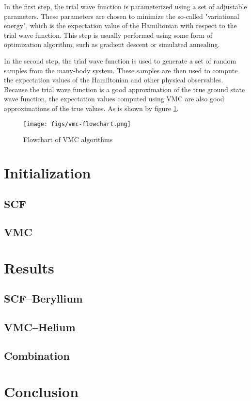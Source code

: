 \documentclass[11pt]{article}
\begin{document}
In the first step, the trial wave function is parameterized using a set of adjustable parameters. These parameters are chosen to minimize the so-called "variational energy", which is the expectation value of the Hamiltonian with respect to the trial wave function. This step is usually performed using some form of optimization algorithm, such as gradient descent or simulated annealing.

In the second step, the trial wave function is used to generate a set of random samples from the many-body system. These samples are then used to compute the expectation values of the Hamiltonian and other physical observables. Because the trial wave function is a good approximation of the true ground state wave function, the expectation values computed using VMC are also good approximations of the true values. As is shown by figure \ref{fig:vmc flowchart}.

\begin{figure}
    \centering
    \texttt{[image: figs/vmc-flowchart.png]}
    \caption{Flowchart of VMC algorithms}
    \label{fig:vmc flowchart}%
\end{figure}

\section{Initialization}

\subsection{SCF}

\subsection{VMC}


\section{Results}
\subsection{SCF--Beryllium}
\subsection{VMC--Helium}
\subsection{Combination}

\section{Conclusion}

\printbibliography %
\end{document}
